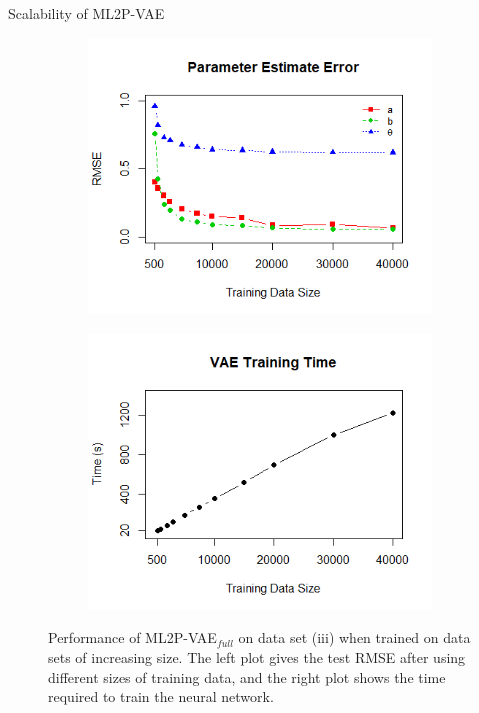 \documentclass{beamer}
\theoremstyle{definition}
\begin{document}
\begin{frame}{Scalability of ML2P-VAE}
\begin{figure}[h]
\centering
    \begin{subfigure}{.47\textwidth}
      \centering
      \includegraphics[width=\linewidth]{../img/ml_journal_results/vae_full_train_size_error.png}
    \end{subfigure}
    \begin{subfigure}{.47\textwidth}
      \centering
      \includegraphics[width=\linewidth]{../img/ml_journal_results/vae_full_train_size_time.png}
    \end{subfigure}
    \caption{Performance of ML2P-VAE$_{full}$ on data set (iii) when trained on data sets of increasing size. The left plot gives the test RMSE after using different sizes of training data, and the right plot shows the time required to train the neural network.}
    \label{fig:train_size}
\end{figure}


\end{frame}
\end{document}
